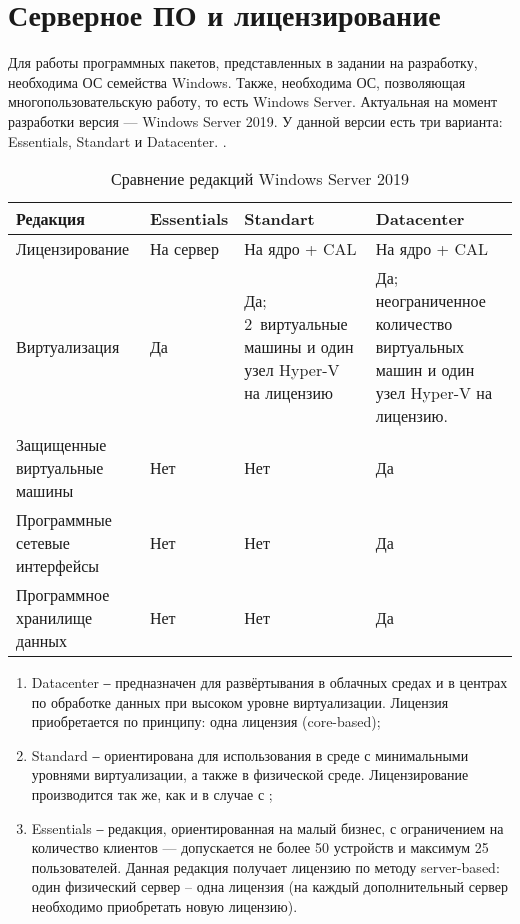 \section{Серверное ПО и лицензирование}

Для работы программных пакетов, представленных в задании на разработку, необходима ОС
семейства Windows. Также, необходима ОС, позволяющая многопользовательскую работу, то
есть Windows Server. Актуальная на момент разработки версия — Windows Server 2019. У
данной версии есть три варианта: Essentials, Standart и Datacenter.
\cite{ref:win_srv_overview}\cite{ref:win_srv_comp}.

\begin{table}[h]
    \centering
    \caption{Сравнение редакций Windows Server 2019}
    \label{tab:win_srv_comp}
    \begin{tabu}to \linewidth{X[1,c,m]X[1,c,m]X[1,c,m]X[1,c,m]}
        \toprule
        Редакция & Essentials & Standart & Datacenter \\
        \midrule
        Лицензирование & На сервер & На ядро + CAL & На ядро + CAL \\
        Виртуализация & Да & Да; 2~виртуальные
        машины и один узел Hyper-V на лицензию & Да; неограниченное количество
        виртуальных машин и один узел Hyper-V на лицензию. \\
        Защищенные виртуальные машины & Нет & Нет & Да \\
        Программные сетевые интерфейсы & Нет & Нет & Да \\
        Программное хранилище данных & Нет & Нет & Да \\
        \bottomrule
    \end{tabu}
\end{table}

\begin{enumerate}
    \item Datacenter ‒ предназначен для развёртывания в облачных средах и в центрах по
        обработке данных при высоком уровне виртуализации. Лицензия приобретается по
        принципу: одна лицензия  (core-based);
    \item Standard ‒ ориентирована для использования в среде с минимальными уровнями
        виртуализации, а также в физической среде. Лицензирование производится так же,
        как и в случае с ;
    \item Essentials ‒ редакция, ориентированная на малый бизнес, с ограничением на
        количество клиентов — допускается не более 50 устройств и максимум 25
        пользователей. Данная редакция получает лицензию по методу server-based:
        один физический сервер – одна лицензия (на каждый дополнительный сервер
        необходимо приобретать новую лицензию).
\end{enumerate}


